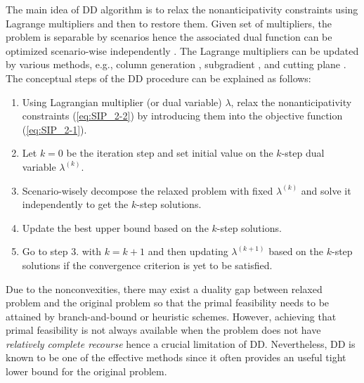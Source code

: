 The main idea of DD algorithm is to relax the nonanticipativity constraints using Lagrange multipliers and then to restore them. Given set of multipliers, the problem is separable by scenarios hence the associated dual function can be optimized scenario-wise independently \cite{journal:CS1999}. The Lagrange multipliers can be updated by various methods, e.g., column generation \cite{journal:LMPS2013,journal:LS2004}, subgradient \cite{journal:CS1999,journal:PO2013,journal:A2013}, and cutting plane \cite{journal:LMPS2013}. The conceptual steps of the DD procedure can be explained as follows:
\begin{enumerate}
	\item Using Lagrangian multiplier (or dual variable) $\lambda$, relax the nonanticipativity constraints (\ref{eq:SIP_2-2}) by introducing them into the objective function (\ref{eq:SIP_2-1}).
	\item Let $k=0$ be the iteration step and set initial value on the $k$-step dual variable $\lambda^{(k)}$.
	\item Scenario-wisely decompose the relaxed problem with fixed $\lambda^{(k)}$ and solve it independently to get the $k$-step solutions.
	\item Update the best upper bound based on the $k$-step solutions.
	\item Go to step 3. with $k=k+1$ and then updating $\lambda^{(k+1)}$ based on the $k$-step solutions if the convergence criterion is yet to be satisfied.
\end{enumerate}
Due to the nonconvexities, there may exist a duality gap between relaxed problem and the original problem so that the primal feasibility needs to be attained by branch-and-bound or heuristic schemes. However, achieving that primal feasibility is not always available when the problem does not have \textit{relatively complete recourse} hence a crucial limitation of DD. Nevertheless, DD is known to be one of the effective methods since it often provides an useful tight lower bound for the original problem.

